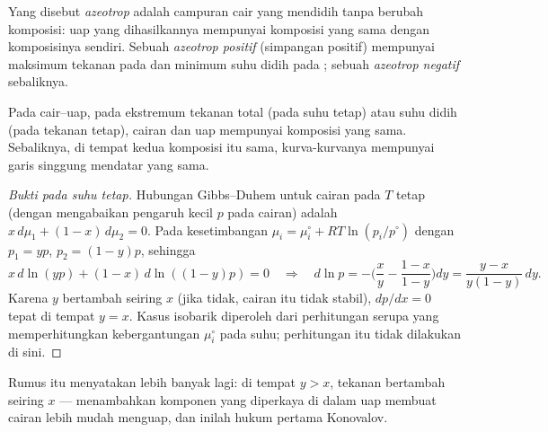 \begin{definition}[Azeotrop]\label{def:b2:liquid-vapour-diagrams:azeotrope}
Yang disebut \emph{azeotrop} adalah campuran cair yang
mendidih tanpa berubah komposisi: uap yang dihasilkannya mempunyai
komposisi yang sama dengan komposisinya sendiri. Sebuah \emph{azeotrop
positif} (simpangan positif) mempunyai maksimum
tekanan pada  dan minimum suhu didih pada ; sebuah \emph{azeotrop negatif}
sebaliknya.
\end{definition}

\begin{theorem}\label{thm:b2:liquid-vapour-diagrams:konovalov}
Pada  cair--uap, pada ekstremum tekanan total (pada suhu
tetap) atau suhu didih (pada tekanan tetap), cairan dan uap mempunyai
komposisi yang sama. Sebaliknya, di tempat kedua komposisi itu sama,
kurva-kurvanya mempunyai garis singgung mendatar yang sama.
\end{theorem}

\begin{proof}[Bukti pada suhu tetap]
Hubungan Gibbs--Duhem untuk cairan pada $T$ tetap (dengan mengabaikan
pengaruh kecil $p$ pada cairan) adalah $x\,d\mu_1 + (1 - x)\,d\mu_2 = 0$.
Pada kesetimbangan $\mu_i = \mu_i^\circ + RT\ln(p_i/p^\circ)$ dengan
$p_1 = yp$, $p_2 = (1 - y)p$, sehingga
\[
  x\,d\ln(yp) + (1 - x)\,d\ln((1 - y)p) = 0
  \quad\Longrightarrow\quad
  d\ln p = -\Big(\frac{x}{y} - \frac{1 - x}{1 - y}\Big)dy
  = \frac{y - x}{y(1 - y)}\,dy .
\]
Karena $y$ bertambah seiring $x$ (jika tidak, cairan itu tidak stabil),
$dp/dx = 0$ tepat di tempat $y = x$. Kasus isobarik diperoleh dari
perhitungan serupa yang memperhitungkan kebergantungan $\mu_i^\circ$ pada
suhu; perhitungan itu tidak dilakukan di sini.
\end{proof}

Rumus itu menyatakan lebih banyak lagi: di tempat $y > x$, tekanan
bertambah seiring $x$ --- menambahkan komponen yang diperkaya di dalam uap
membuat cairan lebih mudah menguap, dan inilah hukum pertama Konovalov.


